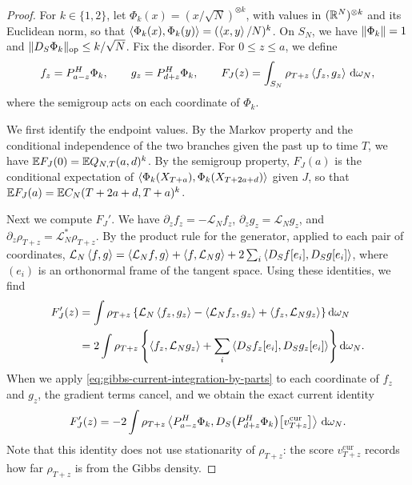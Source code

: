 \begin{proof}
For $k\in\{1,2\}$, let $\Phi_k(x)=(x/\sqrt N)^{\otimes k}$, with values in
$(\mathbb R^N)^{\otimes k}$ and its Euclidean norm, so that
$\left\langle\Phi_k(x),\Phi_k(y)\right\rangle=(\left\langle x,y\right\rangle/N)^k$. On $S_N$, we have
$\lVert\Phi_k\rVert=1$ and $\lVert D_S\Phi_k\rVert_{\mathrm{op}}\le k/\sqrt N$. Fix the disorder.
For $0\le z\le a$, we define
\[
 f_z=P^H_{a-z}\Phi_k,\qquad g_z=P^H_{d+z}\Phi_k,\qquad
 F_J(z)=\int_{S_N}\rho_{T+z}\left\langle f_z,g_z\right\rangle\,\mathop{}\!\mathrm d\omega_N,
\]
where the semigroup acts on each coordinate of $\Phi_k$.

We first identify the endpoint values. By the Markov property and the
conditional independence of the two branches given the past up to time $T$,
we have $\mathbb E F_J(0)=\mathbb E Q_{N,T}(a,d)^k$. By the semigroup property,
$F_J(a)$ is the conditional expectation of
$\left\langle\Phi_k(X_{T+a}),\Phi_k(X_{T+2a+d})\right\rangle$ given $J$, so that
$\mathbb E F_J(a)=\mathbb E C_N(T+2a+d,T+a)^k$.

Next we compute $F_J'$. We have $\partial_zf_z=-\mathcal L_Nf_z$, $\partial_zg_z=\mathcal L_Ng_z$, and
$\partial_z\rho_{T+z}=\mathcal L_N^*\rho_{T+z}$. By the product rule for the
generator, applied to each pair of coordinates,
$\mathcal L_N\left\langle f,g\right\rangle=\left\langle\mathcal L_Nf,g\right\rangle+\left\langle f,\mathcal L_Ng\right\rangle
+2\sum_i\left\langle D_Sf[e_i],D_Sg[e_i]\right\rangle$, where $(e_i)$ is an orthonormal frame of
the tangent space. Using these identities, we find
\[
\begin{aligned}
 F_J'(z)&=\int\rho_{T+z}\left\{\mathcal L_N\left\langle f_z,g_z\right\rangle
 -\left\langle\mathcal L_Nf_z,g_z\right\rangle+\left\langle f_z,\mathcal L_Ng_z\right\rangle\right\}\mathop{}\!\mathrm d\omega_N\\
 &=2\int\rho_{T+z}\left\{\left\langle f_z,\mathcal L_Ng_z\right\rangle
 +\sum_i\left\langle D_Sf_z[e_i],D_Sg_z[e_i]\right\rangle\right\}\mathop{}\!\mathrm d\omega_N.
\end{aligned}
\]
When we apply \eqref{eq:gibbs-current-integration-by-parts} to each
coordinate of $f_z$ and $g_z$, the gradient terms cancel, and we obtain the
exact current identity
\begin{equation}\label{sel:fork-current-identity}
 F_J'(z)=-2\int\rho_{T+z}
 \left\langle P^H_{a-z}\Phi_k,D_S\big(P^H_{d+z}\Phi_k\big)\big[v^{\mathrm{cur}}_{T+z}\big]\right\rangle
 \,\mathop{}\!\mathrm d\omega_N.
\end{equation}
Note that this identity does not use stationarity of $\rho_{T+z}$: the
score $v^{\mathrm{cur}}_{T+z}$ records how far $\rho_{T+z}$ is from the
Gibbs density.


\end{proof}
